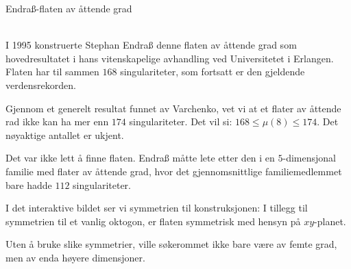 \documentclass[no]{./../../common/SurferDesc}%
\begin{document}
\footnotesize




\begin{surferPage}
  \begin{surferTitle}Endraß-flaten av åttende grad\end{surferTitle} \\
	
	I 1995 konstruerte Stephan Endraß denne flaten av åttende grad som hovedresultatet i hans 
	vitenskapelige avhandling ved Universitetet i Erlangen. Flaten har til sammen $168$ singulariteter, 
	som fortsatt er den gjeldende verdensrekorden. 
  	
	Gjennom et generelt resultat funnet av Varchenko, vet vi at et flater av åttende 
	rad ikke kan ha mer enn $174$ singulariteter. Det vil si: $168 \le \mu(8) \le 174$. Det nøyaktige antallet er ukjent.
	
	Det var ikke lett å finne flaten. Endraß måtte lete etter den i en $5$-dimensjonal familie med flater 
	av åttende grad, hvor det gjennomsnittlige familiemedlemmet bare hadde $112$ singulariteter.

	I det interaktive bildet ser vi symmetrien til konstruksjonen: I tillegg til symmetrien til 
	et vanlig oktogon, er flaten symmetrisk med hensyn på $xy$-planet.

	Uten å bruke slike symmetrier, ville søkerommet ikke bare være av femte grad, men av enda høyere dimensjoner. 
	
  \begin{surferText}
     \end{surferText}
\end{surferPage}
\end{document}
